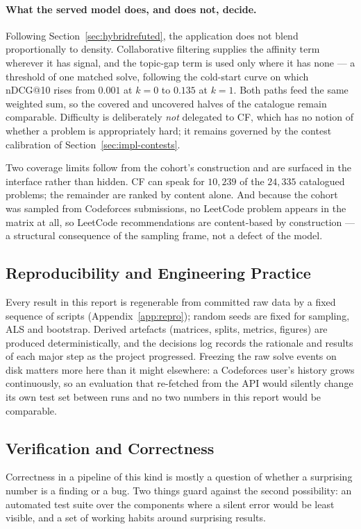 \documentclass[12pt,a4paper]{article}
\newcommand{\ndcg}{nDCG}
\begin{document}
\paragraph{What the served model does, and does not, decide.} Following
Section~\ref{sec:hybridrefuted}, the application does not blend proportionally to
density. Collaborative filtering supplies the affinity term wherever it has signal, and
the topic-gap term is used only where it has none --- a threshold of one matched solve,
following the cold-start curve on which \ndcg{}@10 rises from $0.001$ at $k=0$ to $0.135$
at $k=1$. Both paths feed the same weighted sum, so the covered and uncovered halves of
the catalogue remain comparable. Difficulty is deliberately \emph{not} delegated to CF,
which has no notion of whether a problem is appropriately hard; it remains governed by
the contest calibration of Section~\ref{sec:impl-contests}.

Two coverage limits follow from the cohort's construction and are surfaced in the
interface rather than hidden. CF can speak for $10{,}239$ of the $24{,}335$ catalogued
problems; the remainder are ranked by content alone. And because the cohort was sampled
from Codeforces submissions, no LeetCode problem appears in the matrix at all, so
LeetCode recommendations are content-based by construction --- a structural consequence
of the sampling frame, not a defect of the model.

\subsection{Reproducibility and Engineering Practice}
Every result in this report is regenerable from committed raw data by a fixed sequence of
scripts (Appendix~\ref{app:repro}); random seeds are fixed for sampling, ALS and
bootstrap. Derived artefacts (matrices, splits, metrics, figures) are produced
deterministically, and the decisions log records the rationale and results of each major
step as the project progressed. Freezing the raw solve events on disk matters more here
than it might elsewhere: a Codeforces user's history grows continuously, so an evaluation
that re-fetched from the API would silently change its own test set between runs and no
two numbers in this report would be comparable.

\subsection{Verification and Correctness}
\label{sec:impl-testing}
Correctness in a pipeline of this kind is mostly a question of whether a surprising number
is a finding or a bug. Two things guard against the second possibility: an automated test
suite over the components where a silent error would be least visible, and a set of
working habits around surprising results.
\end{document}
